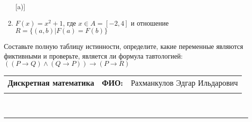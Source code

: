 \documentclass[10pt]{exam}
\newcommand{\class}{Дискретная математика}
\newcommand{\examdate}{}
\begin{document}
\begin{questions}
\begin{enumerate} [a)]
\item $F(x)=x^{2}+1$, где $x \in A = [-2, 4]$ и отношение $R = \{(a,b)|F(a) = F(b)\}$
\end{enumerate}\question Составьте полную таблицу истинности, определите, какие переменные являются фиктивными и проверьте, является ли формула тавтологией:
$(( P \rightarrow Q) \land (Q \rightarrow P)) \rightarrow (P \rightarrow R)$

\end{questions}
\newpage
\begin{flushright}
\begin{tabular}{p{2.8in} r l}
\textbf{\class} & \textbf{ФИО:} &Рахманкулов Эдгар Ильдарович
\\

\textbf{\examdate} &&\\
\end{tabular}\\
\end{flushright}
\rule[1ex]{\textwidth}{.1pt}
\end{document}
